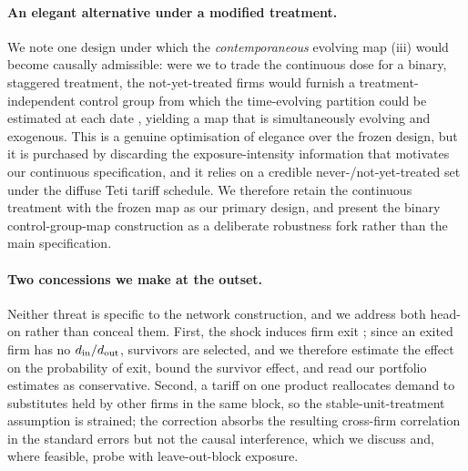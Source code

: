 \paragraph{An elegant alternative under a modified treatment.}
We note one design under which the \emph{contemporaneous} evolving map (iii) would
become causally admissible: were we to trade the continuous dose for a binary,
staggered treatment, the not-yet-treated firms would furnish a treatment-independent
control group from which the time-evolving partition could be estimated at each date
\citep[in the spirit of the control-group construction of][]{callawaysantanna2021},
yielding a map that is simultaneously evolving and exogenous. This is a genuine
optimisation of elegance over the frozen design, but it is purchased by discarding the
exposure-intensity information that motivates our continuous specification, and it
relies on a credible never-/not-yet-treated set under the diffuse Teti tariff
schedule. We therefore retain the continuous treatment with the frozen map as our
primary design, and present the binary control-group-map construction as a deliberate
robustness fork rather than the main specification.

\paragraph{Two concessions we make at the outset.}
Neither threat is specific to the network construction, and we address both head-on
rather than conceal them. First, the shock induces firm exit \citep{crozet2021}; since
an exited firm has no $d_{\rm in}/d_{\rm out}$, survivors are selected, and we therefore
estimate the effect on the probability of exit, bound the survivor effect, and read our
portfolio estimates as conservative. Second, a tariff on one product reallocates demand
to substitutes held by other firms in the same block, so the stable-unit-treatment
assumption is strained; the \citet{adao2019} correction absorbs the resulting
cross-firm correlation in the standard errors but not the causal interference, which we
discuss and, where feasible, probe with leave-out-block exposure.

